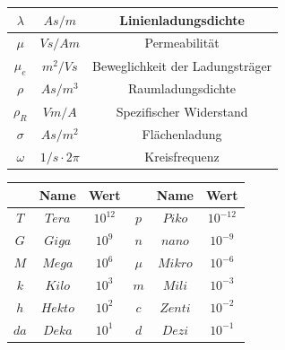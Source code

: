 \documentclass[a4paper, 6pt, landscape]{scrartcl}
\begin{document}
\begin{multicols*}{4}
\begin{tabular}{|c|c|c|}
		\hline
		$\lambda$       & $As/m$           & Linienladungsdichte                \\
		\hline
		$\mu$           & $Vs/Am$          & Permeabilität                     \\
		\hline
		$\mu_e$         & $m^2/Vs$         & Beweglichkeit der Ladungsträger   \\
		\hline
		$\rho$          & $As/m^3$         & Raumladungsdichte                  \\
		\hline
		$\rho_R$        & $Vm/A$           & Spezifischer Widerstand            \\
		\hline
		$\sigma$        & $As/m^2$         & Flächenladung                     \\
		\hline
		$\omega$        & $1/s\cdot 2\pi$  & Kreisfrequenz                      \\
		\hline
	\end{tabular}



	\vspace{-0.0cm}
  \begin{center}

	\begin{tabular}{|c|c|c||c|c|c|}
		\hline
		\textbf{} & \textbf{Name} & \textbf{Wert}  & 	\textbf{} & \textbf{Name} & \textbf{Wert}  \\
		\hline
		$T$       & $Tera$        & $10^{12}$     &
		$p$       & $Piko$        & $10^{-12}$    \\
		\hline
		$G$       & $Giga$        & $10^{9}$      &
		$n$       & $nano$        & $10^{-9}$     \\
		\hline
		$M$       & $Mega$        & $10^{6}$      &
		$\mu$     & $Mikro$       & $10^{-6}$     \\
		\hline
		$k$       & $Kilo$        & $10^{3}$      &
		$m$       & $Mili$        & $10^{-3}$     \\
		\hline
		$h$       & $Hekto$       & $10^{2}$      &
		$c$       & $Zenti$       & $10^{-2}$     \\
		\hline
		$da$      & $Deka$        & $10^{1}$      &
		$d$       & $Dezi$        & $10^{-1}$     \\
    \hline
	\end{tabular}
\end{center}
\end{multicols*}

\setcounter{secnumdepth}{2}
\end{document}
